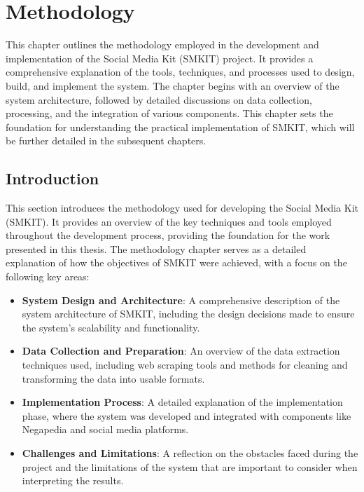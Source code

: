 
\chapter{Methodology}
\label{chp:methodology}
This chapter outlines the methodology employed in the development and implementation of the Social Media Kit (SMKIT) project. It provides a comprehensive explanation of the tools, techniques, and processes used to design, build, and implement the system. The chapter begins with an overview of the system architecture, followed by detailed discussions on data collection, processing, and the integration of various components.
This chapter sets the foundation for understanding the practical implementation of SMKIT, which will be further detailed in the subsequent chapters.


\section{Introduction}
\label{sec:methodology_introduction}
This section introduces the methodology used for developing the Social Media Kit (SMKIT). It provides an overview of the key techniques and tools employed throughout the development process, providing the foundation for the work presented in this thesis. The methodology chapter serves as a detailed explanation of how the objectives of SMKIT were achieved, with a focus on the following key areas:

\begin{itemize}
    \item \textbf{System Design and Architecture}: A comprehensive description of the system architecture of SMKIT, including the design decisions made to ensure the system’s scalability and functionality.
    \item \textbf{Data Collection and Preparation}: An overview of the data extraction techniques used, including web scraping tools and methods for cleaning and transforming the data into usable formats.
    \item \textbf{Implementation Process}: A detailed explanation of the implementation phase, where the system was developed and integrated with components like Negapedia and social media platforms.
    \item \textbf{Challenges and Limitations}: A reflection on the obstacles faced during the project and the limitations of the system that are important to consider when interpreting the results.
\end{itemize}

